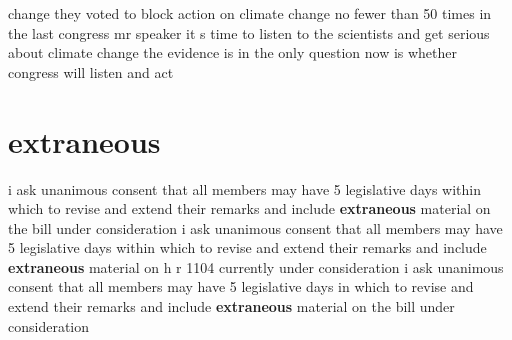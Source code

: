 \documentclass{article}
\begin{document}
change they voted to block action on climate change no fewer than 50 times in the last congress mr speaker it s time to listen to the scientists and get serious about climate change the evidence is in the only question now is whether congress will listen and act\pagebreak

\section*{extraneous}
i ask unanimous consent that all members may have 5 legislative days within which to revise and extend their remarks and include {\bf \color{red} extraneous} material on the bill under consideration
\vspace{8mm}
i ask unanimous consent that all members may have 5 legislative days within which to revise and extend their remarks and include {\bf \color{red} extraneous} material on h r 1104 currently under consideration
\vspace{8mm}
i ask unanimous consent that all members may have 5 legislative days in which to revise and extend their remarks and include {\bf \color{red} extraneous} material on the bill under consideration\pagebreak
\end{document}

